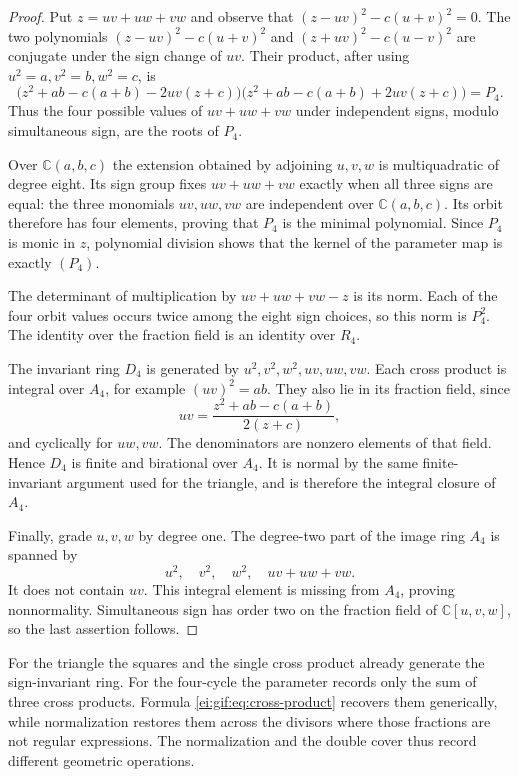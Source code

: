 \begin{proof}
Put $z=uv+uw+vw$ and observe that
$(z-uv)^2-c(u+v)^2=0$.
The two polynomials $(z-uv)^2-c(u+v)^2$ and
$(z+uv)^2-c(u-v)^2$ are conjugate under the sign
change of $uv$. Their product, after using
$u^2=a,v^2=b,w^2=c$, is
\[
 \bigl(z^2+ab-c(a+b)-2uv(z+c)\bigr)
 \bigl(z^2+ab-c(a+b)+2uv(z+c)\bigr)=P_4.
\]
Thus the four possible values of $uv+uw+vw$ under
independent signs, modulo simultaneous sign, are
the roots of $P_4$.

Over $\mathbb C(a,b,c)$ the extension obtained by
adjoining $u,v,w$ is multiquadratic of degree eight.
Its sign group fixes $uv+uw+vw$ exactly when all
three signs are equal: the three monomials $uv,uw,vw$
are independent over $\mathbb C(a,b,c)$.
Its orbit therefore has four elements, proving that
$P_4$ is the minimal polynomial. Since $P_4$ is
monic in $z$, polynomial division shows that the
kernel of the parameter map is exactly $(P_4)$.

The determinant of multiplication by
$uv+uw+vw-z$ is its norm. Each of the four orbit
values occurs twice among the eight sign choices,
so this norm is $P_4^2$. The identity over the
fraction field is an identity over $R_4$.

The invariant ring $D_4$ is generated by
$u^2,v^2,w^2,uv,uw,vw$. Each cross product is
integral over $A_4$, for example $(uv)^2=ab$.
They also lie in its fraction field, since
\begin{equation}\label{ei:gif:eq:cross-product}
 uv=\frac{z^2+ab-c(a+b)}{2(z+c)},
\end{equation}
and cyclically for $uw,vw$. The denominators are
nonzero elements of that field. Hence $D_4$ is
finite and birational over $A_4$.
It is normal by the same finite-invariant argument
used for the triangle, and is therefore the
integral closure of $A_4$.

Finally, grade $u,v,w$ by degree one. The degree-two
part of the image ring $A_4$ is spanned by
\[
 u^2,\quad v^2,\quad w^2,\quad uv+uw+vw.
\]
It does not contain $uv$. This integral element is
missing from $A_4$, proving nonnormality. Simultaneous
sign has order two on the fraction field of
$\mathbb C[u,v,w]$, so the last assertion follows.
\end{proof}

For the triangle the squares and the single cross
product already generate the sign-invariant ring.
For the four-cycle the parameter records only the
sum of three cross products. Formula
\eqref{ei:gif:eq:cross-product} recovers them generically,
while normalization restores them across the divisors
where those fractions are not regular expressions.
The normalization and the double cover thus record
different geometric operations.


